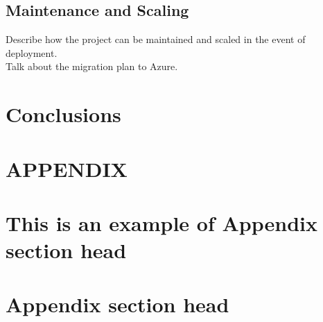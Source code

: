 \documentclass[prodmode,acmtecs]{acmsmall} %
\begin{document}
\subsection{Maintenance and Scaling}
Describe how the project can be maintained and scaled in the event of deployment.\\
Talk about the migration plan to Azure.\\

\section{Conclusions}


\appendix
\section*{APPENDIX}
\setcounter{section}{1}


\begin{acks}
\end{acks}  





\elecappendix

\medskip

\section{This is an example of Appendix section head}


\section{Appendix section head}
\end{document}
